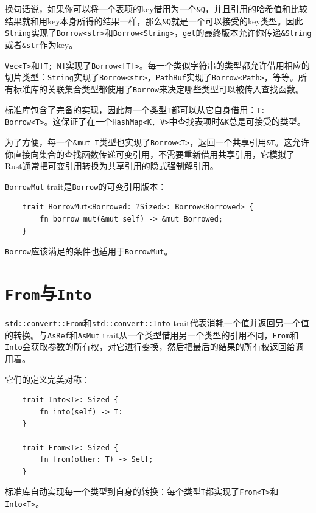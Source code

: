 换句话说，如果你可以将一个表项的key借用为一个\texttt{\&Q}，并且引用的哈希值和比较结果就和用key本身所得的结果一样，那么\texttt{\&Q}就是一个可以接受的key类型。因此\texttt{String}实现了\texttt{Borrow<str>}和\texttt{Borrow<String>}，\texttt{get}的最终版本允许你传递\texttt{\&String}或者\texttt{\&str}作为key。

\texttt{Vec<T>}和\texttt{[T; N]}实现了\texttt{Borrow<[T]>}。每一个类似字符串的类型都允许借用相应的切片类型：\texttt{String}实现了\texttt{Borrow<str>}，\texttt{PathBuf}实现了\texttt{Borrow<Path>}，等等。所有标准库的关联集合类型都使用了\texttt{Borrow}来决定哪些类型可以被传入查找函数。

标准库包含了完备的实现，因此每一个类型\texttt{T}都可以从它自身借用：\texttt{T: Borrow<T>}。这保证了在一个\texttt{HashMap<K, V>}中查找表项时\texttt{\&K}总是可接受的类型。

为了方便，每一个\texttt{\&mut T}类型也实现了\texttt{Borrow<T>}，返回一个共享引用\texttt{\&T}。这允许你直接向集合的查找函数传递可变引用，不需要重新借用共享引用，它模拟了Rust通常把可变引用转换为共享引用的隐式强制解引用。

\texttt{BorrowMut} trait是\texttt{Borrow}的可变引用版本：
\begin{verbatim}
    trait BorrowMut<Borrowed: ?Sized>: Borrow<Borrowed> {
        fn borrow_mut(&mut self) -> &mut Borrowed;
    }
\end{verbatim}

\texttt{Borrow}应该满足的条件也适用于\texttt{BorrowMut}。

\section{\texttt{From}与\texttt{Into}}\label{from}

\texttt{std::convert::From}和\texttt{std::convert::Into} trait代表消耗一个值并返回另一个值的转换。与\texttt{AsRef}和\texttt{AsMut} trait从一个类型借用另一个类型的引用不同，\texttt{From}和\texttt{Into}会获取参数的所有权，对它进行变换，然后把最后的结果的所有权返回给调用着。

它们的定义完美对称：
\begin{verbatim}
    trait Into<T>: Sized {
        fn into(self) -> T:
    }

    trait From<T>: Sized {
        fn from(other: T) -> Self;
    }
\end{verbatim}

标准库自动实现每一个类型到自身的转换：每个类型\texttt{T}都实现了\texttt{From<T>}和\texttt{Into<T>}。

